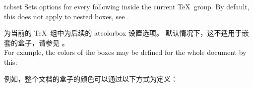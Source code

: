 \begin{docCommand}{tcbset}{}
Sets options for every following  inside the current \TeX\ group.
By default, this does not apply to nested boxes, see .

为当前的 \TeX\ 组中为后续的 a{tcolorbox} 设置选项。 默认情况下，这不适用于嵌套的盒子，请参见 。\\[0.5ex]
For example, the colors of the boxes may be defined for the whole document by this:


例如，整个文档的盒子的颜色可以通过以下方式为定义：
  
\begin{dispListing}
\end{dispListing}
\end{docCommand}